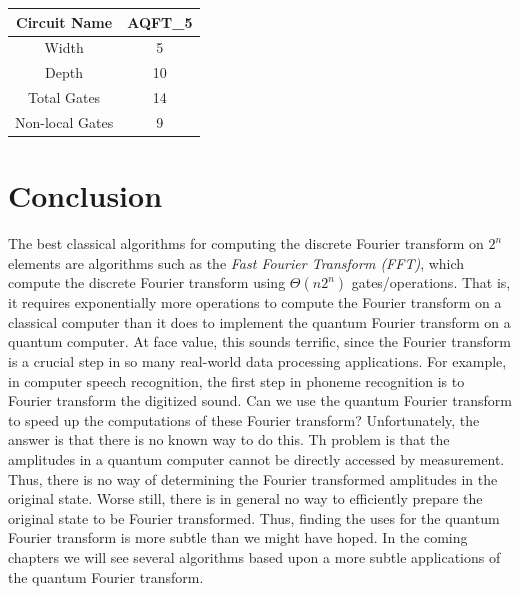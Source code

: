 \begin{table}[ht]
    \centering
    \begin{tabular}{|c|c|}
    \hline
        Circuit Name & AQFT\_5\\
        \hline
        Width & 5 \\
        \hline
        Depth & 10\\
        \hline
        Total Gates & 14\\
        \hline
        Non-local Gates & 9\\
        \hline
    \end{tabular}
\end{table}
\section{Conclusion}
The best classical algorithms for computing the discrete Fourier transform on $2^n$ elements are algorithms such as the \textit{Fast Fourier Transform (FFT)}, which compute the discrete Fourier transform using $\Theta(n2^n)$ gates/operations. That is, it requires exponentially more operations to compute the Fourier transform on a classical computer than it does to implement the quantum Fourier transform on a quantum computer. At face value, this sounds terrific, since the Fourier transform is a crucial step in so many real-world data processing applications. For example, in computer speech recognition, the first step in phoneme recognition is to Fourier transform the digitized sound. Can we use the quantum Fourier transform to speed up the computations of these Fourier transform? Unfortunately, the answer is that there is no known way to do this. Th problem is that the amplitudes in a quantum computer cannot be directly accessed by measurement. Thus, there is no way of determining the Fourier transformed amplitudes in the original state. Worse still, there is in general no way to efficiently prepare the original state to be Fourier transformed. Thus, finding the uses for the quantum Fourier transform is more subtle than we might have hoped. In the coming chapters we will see several algorithms based upon a more subtle applications of the quantum Fourier transform.










\chapterreferences
